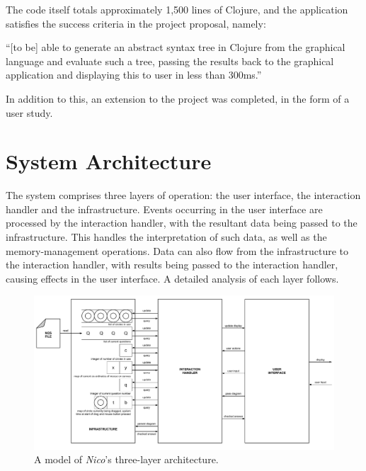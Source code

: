 \documentclass[12pt,twoside,notitlepage,xetex]{report}
\begin{document}
{The code itself totals approximately 1,500 lines of Clojure, and the application satisfies the success criteria in the project proposal, namely:
\begin{center}
\parbox[c]{\textwidth-2cm}{
\small
``[to be] able to generate an abstract syntax tree in Clojure from the graphical language and evaluate such a tree, passing the results back to the graphical application and displaying this to user in less than 300ms.''
}
\end{center}
In addition to this, an extension to the project was completed, in the form of a user study.

\section{System Architecture}

The system comprises three layers of operation: the user interface, the interaction handler and the infrastructure.  Events occurring in the user interface are processed by the interaction handler, with the resultant data being passed to the infrastructure.  This handles the interpretation of such data, as well as the memory-management operations.  Data can also flow from the infrastructure to the interaction handler, with results being passed to the interaction handler, causing effects in the user interface.  A detailed analysis of each layer follows.

\begin{landscape}
\begin{center}
\begin{figure}[H]
\begin{center}
\includegraphics[height=\textheight-2cm]{figs/nico_arch_new.pdf}
\end{center}
\caption{A model of \emph{Nico}'s three-layer architecture.}
\label{fig:NicoArch}
\end{figure}
\end{center}
\end{landscape}

}
\end{document}

